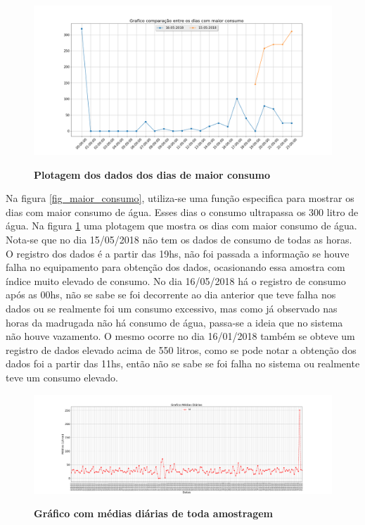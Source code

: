 \begin{figure}[ht]
	\caption{\textbf{Plotagem dos dados dos dias de maior consumo}}
	\centering
		\includegraphics[width=\textwidth,height=\textheight , keepaspectratio]{figuras/comparacaoentreosdiascommaiorconsumo}
		\label{plot_maior_consumo}
\end{figure}

\par Na figura \ref{fig_maior_consumo},  utiliza-se uma função especifica para mostrar os dias com maior consumo de água. Esses dias o consumo ultrapassa os 300 litro de água. Na figura \ref{plot_maior_consumo} uma plotagem que mostra os dias com maior consumo de água. Nota-se que no dia 15/05/2018 não tem os dados de consumo de todas as horas. O registro dos  dados é a partir das 19hs, não foi passada a informação se houve falha no equipamento para obtenção dos dados, ocasionando essa amostra com índice muito elevado de consumo. No dia 16/05/2018 há o registro de consumo após as 00hs, não se sabe se foi decorrente ao dia anterior que teve falha nos dados ou se realmente foi um consumo excessivo, mas como já observado nas horas da madrugada não há consumo de água, passa-se a ideia que no sistema não houve vazamento. O mesmo ocorre no  dia 16/01/2018 também se obteve um registro de dados elevado acima de 550 litros, como se pode notar a obtenção dos dados foi a partir das 11hs, então não se sabe se foi falha no sistema ou realmente teve um consumo elevado.

\begin{figure}[ht]
	\caption{\textbf{Gráfico com médias diárias de toda amostragem}}
	\centering
		\includegraphics[width=\textwidth,height=\textheight , keepaspectratio]{figuras/GraficoMediasDiarias(este)}
		\label{graf_media_diaria}
\end{figure}

